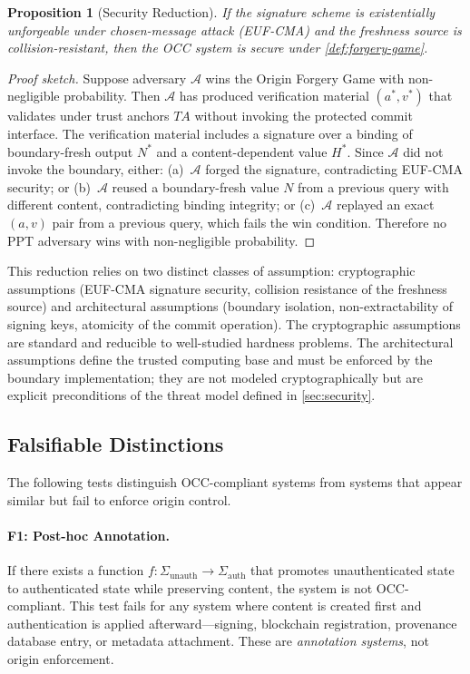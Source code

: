\documentclass[11pt,letterpaper]{article}
\theoremstyle{occplain}
\newtheorem{proposition}{Proposition}[section]
\theoremstyle{occremark}
\newcommand{\Sigauth}{\Sigma_{\mathrm{auth}}}
\newcommand{\Sigunauth}{\Sigma_{\mathrm{unauth}}}
\begin{document}
\begin{proposition}[Security Reduction]
\label{prop:security-reduction}
If the signature scheme is existentially unforgeable under chosen-message attack (EUF-CMA) and the freshness source is collision-resistant, then the OCC system is secure under \cref{def:forgery-game}.
\end{proposition}

\begin{proof}[Proof sketch]
Suppose adversary $\mathcal{A}$ wins the Origin Forgery Game with non-negligible probability. Then $\mathcal{A}$ has produced verification material $(a^*, v^*)$ that validates under trust anchors $\mathit{TA}$ without invoking the protected commit interface. The verification material includes a signature over a binding of boundary-fresh output $N^*$ and a content-dependent value $H^*$. Since $\mathcal{A}$ did not invoke the boundary, either: (a)~$\mathcal{A}$ forged the signature, contradicting EUF-CMA security; or (b)~$\mathcal{A}$ reused a boundary-fresh value $N$ from a previous query with different content, contradicting binding integrity; or (c)~$\mathcal{A}$ replayed an exact $(a, v)$ pair from a previous query, which fails the win condition. Therefore no PPT adversary wins with non-negligible probability.
\end{proof}

This reduction relies on two distinct classes of assumption: cryptographic assumptions (EUF-CMA signature security, collision resistance of the freshness source) and architectural assumptions (boundary isolation, non-extractability of signing keys, atomicity of the commit operation). The cryptographic assumptions are standard and reducible to well-studied hardness problems. The architectural assumptions define the trusted computing base and must be enforced by the boundary implementation; they are not modeled cryptographically but are explicit preconditions of the threat model defined in \cref{sec:security}.


\subsection{Falsifiable Distinctions}
\label{sec:falsifiers}

The following tests distinguish OCC-compliant systems from systems that appear similar but fail to enforce origin control.

\paragraph{F1: Post-hoc Annotation.}
If there exists a function $f: \Sigunauth \rightarrow \Sigauth$ that promotes unauthenticated state to authenticated state while preserving content, the system is not OCC-compliant. This test fails for any system where content is created first and authentication is applied afterward---signing, blockchain registration, provenance database entry, or metadata attachment. These are \emph{annotation systems}, not origin enforcement.
\end{document}
